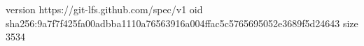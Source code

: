 version https://git-lfs.github.com/spec/v1
oid sha256:9a7f7f425fa00adbba1110a76563916a004ffac5c5765695052e3689f5d24643
size 3534
